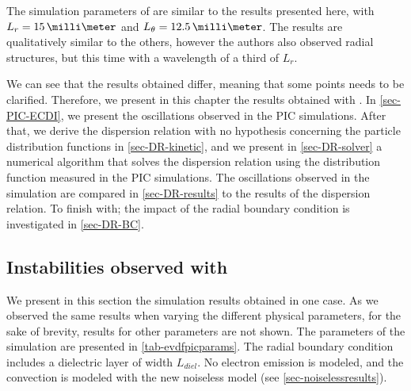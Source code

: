     The simulation parameters of \citet{taccogna2019} are similar to the results presented here, with  $L_r = 15\,\milli\meter$ and $L_{\theta} = 12.5 \,\milli\meter$.
    The results are qualitatively similar to the others, however the authors also observed radial structures, but this time with a wavelength of a third of $L_r$.
        
    \vspace{1ex}
    We can see that the results obtained differ, meaning that some points needs to be clarified.
    Therefore, we present in this chapter the results obtained with \LPPic{}.  
    In \cref{sec-PIC-ECDI}, we present the oscillations observed in the \ac{PIC} simulations.
    After that, we derive the dispersion relation with no hypothesis concerning the particle distribution functions in \cref{sec-DR-kinetic}, and we present in \cref{sec-DR-solver} a numerical algorithm that solves the dispersion relation using the distribution function measured in the \ac{PIC} simulations.
    The oscillations observed in the simulation are compared in \cref{sec-DR-results} to the results of the dispersion relation.
    To finish with; the impact of the radial boundary condition is investigated in \cref{sec-DR-BC}.


  \subsection{Instabilities observed with \LPPic} \label{subsec-lppic_ECDI}
  
  We present in this section the simulation results obtained in one case.
  As we observed the same results when varying the  different physical parameters, for the sake of brevity, results for other parameters are not shown.
  The parameters of the simulation are presented in \cref{tab-evdfpicparams}.
  The radial boundary condition includes a dielectric layer of width $L_{diel}$.
  No electron emission is modeled, and the convection is modeled with the new noiseless model (see \cref{sec-noiselessresults}).
  
